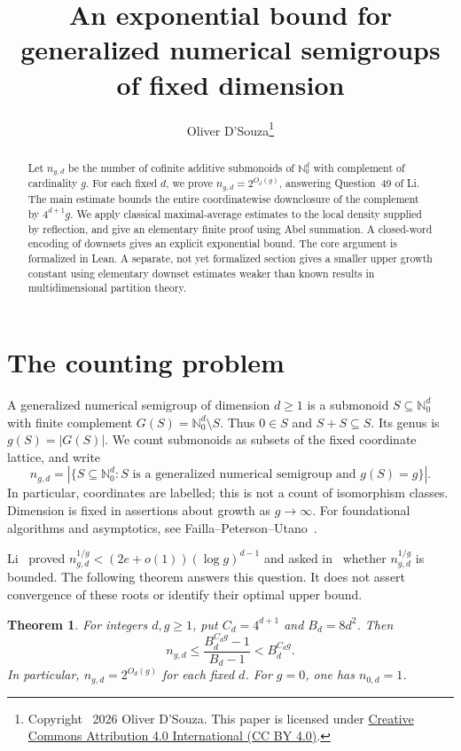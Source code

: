 \documentclass[11pt]{article}
\title{An exponential bound for generalized numerical semigroups of fixed dimension}
\author{Oliver D'Souza\thanks{Copyright \textcopyright\ 2026 Oliver D'Souza.
This paper is licensed under
\href{https://creativecommons.org/licenses/by/4.0/}{Creative Commons Attribution 4.0 International (CC BY 4.0)}.}}
\date{}
\newtheorem{theorem}{Theorem}
\theoremstyle{remark}
\newcommand{\N}{\mathbb N_0}
\begin{document}
\maketitle
\begin{abstract}
Let $n_{g,d}$ be the number of cofinite additive submonoids of $\N^d$ with
complement of cardinality $g$. For each fixed $d$, we prove
$n_{g,d}=2^{O_d(g)}$, answering Question~49 of Li. The main estimate bounds
the entire coordinatewise downclosure of the complement by $4^{d+1}g$.
We apply classical maximal-average estimates to the local density supplied
by reflection, and give an elementary finite proof using Abel summation.
A closed-word encoding of downsets gives an explicit exponential bound.
The core argument is formalized in Lean. A separate, not yet formalized
section gives a smaller upper growth constant using elementary downset
estimates weaker than known results in multidimensional partition theory.
\end{abstract}

\section{The counting problem}
A generalized numerical semigroup of dimension $d\ge1$ is a submonoid
$S\subseteq\N^d$ with finite complement $G(S)=\N^d\setminus S$.
Thus $0\in S$ and $S+S\subseteq S$. Its genus is $g(S)=|G(S)|$.
We count submonoids as subsets of the fixed coordinate lattice, and write
\[
 n_{g,d}=|\{S\subseteq\N^d:S\text{ is a generalized numerical semigroup
 and }g(S)=g\}|.
\]
In particular, coordinates are labelled; this is not a count of isomorphism
classes. Dimension is fixed in assertions about growth as $g\to\infty$.
For foundational algorithms and asymptotics, see
Failla--Peterson--Utano~\cite{FPU}.

Li~\cite[Theorem~2]{Li} proved
$n_{g,d}^{1/g}<(2e+o(1))(\log g)^{d-1}$ and asked
in~\cite[Question~49, p.~23]{Li} whether $n_{g,d}^{1/g}$ is bounded.
The following theorem answers this question. It does not assert convergence
of these roots or identify their optimal upper bound.

\begin{theorem}\label{thm:main}
For integers $d,g\ge1$, put $C_d=4^{d+1}$ and $B_d=8d^2$. Then
\begin{equation}\label{eq:main}
 n_{g,d}\le \frac{B_d^{C_dg}-1}{B_d-1}<B_d^{C_dg}.
\end{equation}
In particular, $n_{g,d}=2^{O_d(g)}$ for each fixed $d$.
For $g=0$, one has $n_{0,d}=1$.
\end{theorem}
\end{document}
